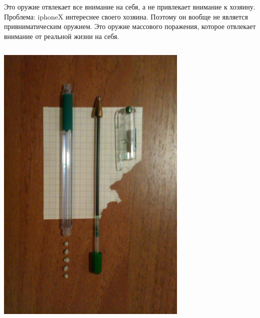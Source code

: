 Это оружие отвлекает все внимание на себя, а не привлекает внимание к хозяину. Проблема: iphoneX интереснее своего хозяина. Поэтому он вообще не является привниматическим оружием. Это оружие массового поражения, которое отвлекает внимание от реальной жизни на себя.

\begin{frame}  %
    \begin{columns}
            \begin{center}
                \includegraphics[width=.8\textwidth]{fig/airpipe}
            \end{center}
            

\end{columns}
\end{frame}
